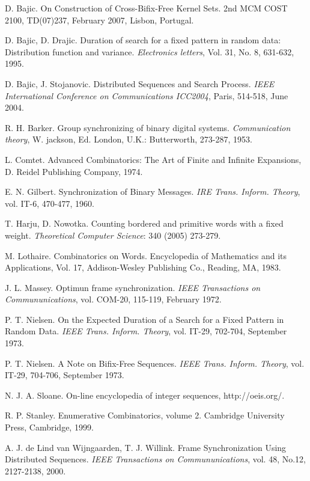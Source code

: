 \documentclass[a4paper,11pt]{article}
\begin{document}
\begin{thebibliography}{99}

 D. Bajic. On Construction of Cross-Bifix-Free Kernel Sets.
2nd MCM COST 2100, TD(07)237, February 2007, Lisbon, Portugal.

 D. Bajic, D. Drajic. Duration of search for a fixed
pattern in random data: Distribution function and variance.
\emph{Electronics letters}, Vol. 31, No. 8, 631-632, 1995.

 D. Bajic, J. Stojanovic. Distributed Sequences and
Search Process. \emph{IEEE International Conference on
Communications ICC2004}, Paris, 514-518, June 2004.

 R. H. Barker. Group synchronizing of binary digital
systems. \emph{Communication theory}, W. jackson, Ed. London,
U.K.: Butterworth, 273-287, 1953.

 L. Comtet. Advanced Combinatorics: The Art of Finite
and Infinite Expansions, D. Reidel Publishing Company, 1974.

 E. N. Gilbert. Synchronization of Binary Messages.
\emph{IRE Trans. Inform. Theory}, vol. IT-6, 470-477, 1960.

 T. Harju, D. Nowotka. Counting bordered and
primitive words with a fixed weight. \emph{Theoretical Computer
Science}: 340 (2005) 273-279.

 M. Lothaire. Combinatorics on Words. Encyclopedia of
Mathematics and its Applications, Vol. 17, Addison-Wesley
Publishing Co., Reading, MA, 1983.

 J. L. Massey. Optimun frame synchronization.
\emph{IEEE Transactions on Commununications}, vol. COM-20,
115-119, February 1972.

 P. T. Nielsen. On the Expected Duration of a Search
for a Fixed Pattern in Random Data. \emph{IEEE Trans. Inform.
Theory}, vol. IT-29, 702-704, September 1973.

 P. T. Nielsen. A Note on Bifix-Free Sequences.
\emph{IEEE Trans. Inform. Theory}, vol. IT-29, 704-706, September
1973.

 N. J. A. Sloane. On-line encyclopedia of integer
sequences, http://oeis.org/.

 R. P. Stanley. Enumerative Combinatorics, volume 2.
Cambridge University Press, Cambridge, 1999.

 A. J. de Lind van Wijngaarden, T. J. Willink. Frame
Synchronization Using Distributed Sequences. \emph{IEEE
Transactions on Commununications}, vol. 48, No.12, 2127-2138,
2000.

\end{thebibliography}
\end{document}

